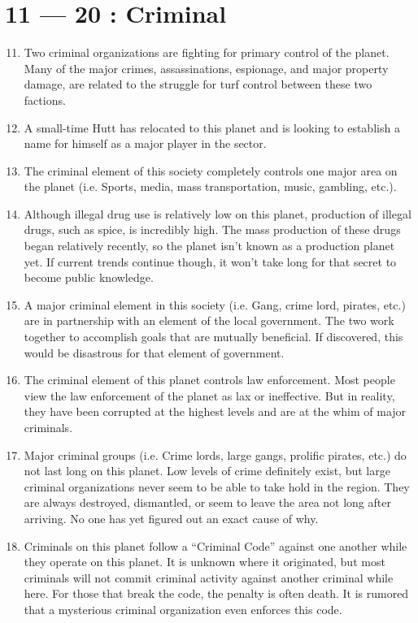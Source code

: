 \documentclass{article}
\begin{document}
\section*{11 --- 20 : Criminal}
\begin{enumerate}
	\setcounter{enumi}{10}
	\item Two criminal organizations are fighting for primary control of the planet. Many of the major crimes, assassinations, espionage, and major property damage, are related to the struggle for turf control between these two factions.
	\item A small-time Hutt has relocated to this planet and is looking to establish a name for himself as a major player in the sector.
	\item The criminal element of this society completely controls one major area on the planet (i.e. Sports, media, mass transportation, music, gambling, etc.).
	\item Although illegal drug use is relatively low on this planet, production of illegal drugs, such as spice, is incredibly high. The mass production of these drugs began relatively recently, so the planet isn’t known as a production planet yet. If current trends continue though, it won’t take long for that secret to become public knowledge.
	\item A major criminal element in this society (i.e. Gang, crime lord, pirates, etc.) are in partnership with an element of the local government. The two work together to accomplish goals that are mutually beneficial. If discovered, this would be disastrous for that element of government.
	\item The criminal element of this planet controls law enforcement. Most people view the law enforcement of the planet as lax or ineffective. But in reality, they have been corrupted at the highest levels and are at the whim of major criminals.
	\item Major criminal groups (i.e. Crime lords, large gangs, prolific pirates, etc.) do not last long on this planet. Low levels of crime definitely exist, but large criminal organizations never seem to be able to take hold in the region. They are always destroyed, dismantled, or seem to leave the area not long after arriving. No one has yet figured out an exact cause of why.
	\item Criminals on this planet follow a “Criminal Code” against one another while they operate on this planet. It is unknown where it originated, but most criminals will not commit criminal activity against another criminal while here. For those that break the code, the penalty is often death. It is rumored that a mysterious criminal organization even enforces this code.

\end{enumerate}
\end{document}
